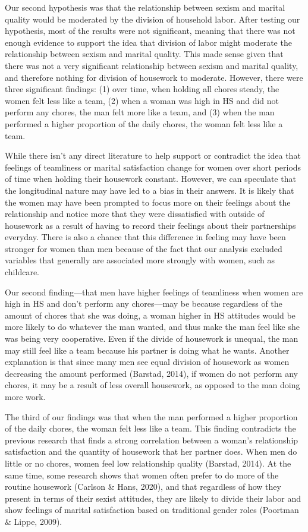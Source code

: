 \documentclass[
  man]{apa6}
\begin{document}
Our second hypothesis was that the relationship between sexism and marital quality would be moderated by the division of household labor. After testing our hypothesis, most of the results were not significant, meaning that there was not enough evidence to support the idea that division of labor might moderate the relationship between sexism and marital quality. This made sense given that there was not a very significant relationship between sexism and marital quality, and therefore nothing for division of housework to moderate. However, there were three significant findings: (1) over time, when holding all chores steady, the women felt less like a team, (2) when a woman was high in HS and did not perform any chores, the man felt more like a team, and (3) when the man performed a higher proportion of the daily chores, the woman felt less like a team.

While there isn't any direct literature to help support or contradict the idea that feelings of teamliness or marital satisfaction change for women over short periods of time when holding their housework constant. However, we can speculate that the longitudinal nature may have led to a bias in their answers. It is likely that the women may have been prompted to focus more on their feelings about the relationship and notice more that they were dissatisfied with outside of housework as a result of having to record their feelings about their partnerships everyday. There is also a chance that this difference in feeling may have been stronger for women than men because of the fact that our analysis excluded variables that generally are associated more strongly with women, such as childcare.

Our second finding---that men have higher feelings of teamliness when women are high in HS and don't perform any chores---may be because regardless of the amount of chores that she was doing, a woman higher in HS attitudes would be more likely to do whatever the man wanted, and thus make the man feel like she was being very cooperative. Even if the divide of housework is unequal, the man may still feel like a team because his partner is doing what he wants. Another explanation is that since many men see equal division of housework as women decreasing the amount performed (Barstad, 2014), if women do not perform any chores, it may be a result of less overall housework, as opposed to the man doing more work.

The third of our findings was that when the man performed a higher proportion of the daily chores, the woman felt less like a team. This finding contradicts the previous research that finds a strong correlation between a woman's relationship satisfaction and the quantity of housework that her partner does. When men do little or no chores, women feel low relationship quality (Barstad, 2014). At the same time, some research shows that women often prefer to do more of the routine housework (Carlson \& Hans, 2020), and that regardless of how they present in terms of their sexist attitudes, they are likely to divide their labor and show feelings of marital satisfaction based on traditional gender roles (Poortman \& Lippe, 2009).
\end{document}
